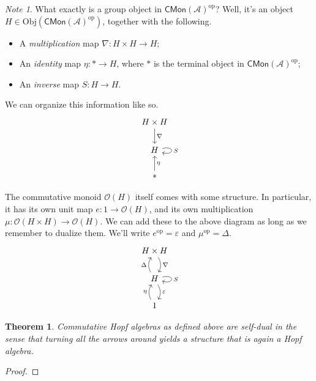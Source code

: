 \documentclass[a4paper,10pt]{scrreprt}
\newcommand{\Obj}{\mathrm{Obj}}
\theoremstyle{definition}
\theoremstyle{plain}
\newtheorem{theorem}{Theorem}[section]
\theoremstyle{remark}
\newtheorem{note}{Note}[section]
\begin{document}
\begin{note}
  What exactly is a group object in $\mathsf{CMon}(\mathscr{A})^{\text{op}}$? Well, it's an object $H \in \Obj(\mathsf{CMon}(\mathscr{A})^{\text{op}})$, together with the following.
  \begin{itemize}
    \item A \emph{multiplication} map $\nabla\colon H \times H \to H$;
    \item An \emph{identity} map $\eta\colon * \to H$, where $*$ is the terminal object in $\mathsf{CMon}(\mathscr{A})^{\mathrm{op}}$;
    \item An \emph{inverse} map $S\colon H \to H$.
  \end{itemize}
  We can organize this information like so.
  \begin{equation*}
    \begin{tikzcd}
      H \times H
      \arrow[d, "\nabla"]
      \\
      H 
      \arrow[loop right, "S"]
      \\
      *
      \arrow[u, swap, "\eta"]
    \end{tikzcd}
  \end{equation*}

  The commutative monoid $\mathscr{O}(H)$ itself comes with some structure. In particular, it has its own unit map $e\colon 1 \to \mathscr{O}(H)$, and its own multiplication $\mu\colon \mathscr{O}(H \times H) \to \mathscr{O}(H)$. We can add these to the above diagram as long as we remember to dualize them. We'll write $e^{\mathrm{op}} = \varepsilon$ and $\mu^{\mathrm{op}} = \Delta$.
  \begin{equation*}
    \begin{tikzcd}
      H \times H
      \arrow[d, bend left, "\nabla"]
      \\
      H 
      \arrow[u, bend left, "\Delta"]
      \arrow[loop right, "S"]
      \arrow[d, bend left, "\varepsilon"]
      \\
      1
      \arrow[u, bend left, "\eta"]
    \end{tikzcd}
  \end{equation*}
\end{note}

\begin{theorem}
  Commutative Hopf algebras as defined above are \emph{self-dual} in the sense that turning all the arrows around yields a structure that is again a Hopf algebra.
\end{theorem}
\begin{proof}

\end{proof}
\end{document}
